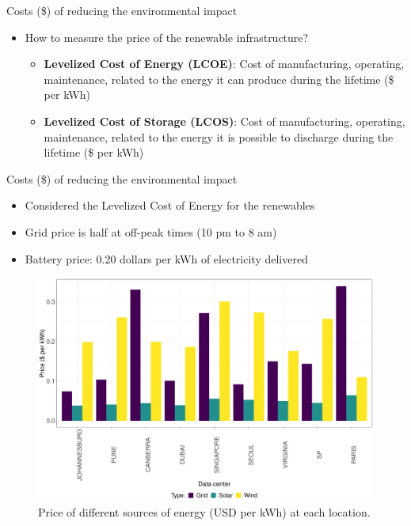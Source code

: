 \documentclass[Ligatures=TeX,table,svgnames,usetotalslideindicator,compress,10pt,aspectratio=169]{beamer}
\begin{document}
\begin{frame}{Costs (\$) of reducing the environmental impact}

  \begin{itemize}  
  \item   How to measure the price of the renewable infrastructure? 
  
  \begin{itemize}
  
  \item  \textbf{Levelized Cost of Energy (LCOE)}: Cost of manufacturing, operating, maintenance, related to the energy it can produce during the lifetime (\$ per kWh)
  \item  \textbf{Levelized Cost of Storage (LCOS)}: Cost of manufacturing, operating, maintenance, related to the energy it is possible to discharge during the lifetime (\$ per kWh)
  
  \end{itemize}
      
  \end{itemize}
 
 
\end{frame}

\addtocounter{framenumber}{-1}

\begin{frame}{Costs (\$) of reducing the environmental impact}
  \begin{itemize}
  
  \item   Considered the Levelized Cost of Energy for the renewables
  \item   Grid price is half at off-peak times (10 pm to 8 am)
  \item   Battery price: 0.20 dollars per kWh of electricity delivered
  
  \end{itemize}
  \begin{figure}[!htbp]
    \centering
    \includegraphics[width=.65\textwidth]{images/price_electricity.pdf}
    \caption{Price of different sources of energy (USD per kWh) at each location.}
    \label{fig:sizing}
  \end{figure}
  
\end{frame}
\end{document}
